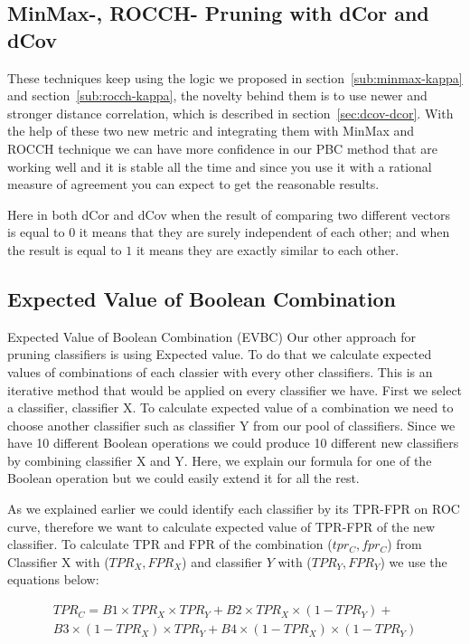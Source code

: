 \subsection{MinMax-, ROCCH- Pruning with dCor and dCov}
\label{sub:minmax-rocch-dcov}
These techniques keep using the logic we proposed in section~\ref{sub:minmax-kappa} and section~\ref{sub:rocch-kappa}, the novelty behind them is to use newer and stronger distance correlation, which is described in section~\ref{sec:dcov-dcor}. With the help of these two new metric and integrating them with MinMax and ROCCH technique we can have more confidence in our PBC method that are working well and it is stable all the time and since you use it with a rational measure of agreement you can expect to get the reasonable results.

Here in both dCor and dCov when the result of comparing two different vectors is equal to $0$ it means that they are surely independent of each other; and when the result is equal to $1$ it means they are exactly similar to each other.

\subsection{Expected Value of Boolean Combination}
\label{sub:expected-value}

Expected Value of Boolean Combination (EVBC)
Our other approach for pruning classifiers is using Expected value. To do that we calculate expected values of combinations of each classier with every other classifiers. This is an iterative method that would be applied on every classifier we have. First we select a classifier, classifier X. To calculate expected value of a combination we need to choose another classifier such as classifier Y from our pool of classifiers. Since we have 10 different Boolean operations we could produce 10 different new classifiers by combining classifier X and Y. Here, we explain our formula for one of the Boolean operation but we could easily extend it for all the rest.

As we explained earlier we could identify each classifier by its TPR-FPR on ROC curve, therefore we want to calculate expected value of TPR-FPR of the new classifier. To calculate TPR and FPR of the combination ($tpr_C, fpr_C$) from Classifier X with ($TPR_X, FPR_X$) and classifier $Y$ with ($TPR_Y, FPR_Y$) we use the equations below:

\begin{multline}
TPR_C = B1 \times TPR_X \times TPR_Y+B2\times TPR_X \times(1- TPR_Y)+\\B3\times(1- TPR_X)\times TPR_Y+B4\times(1- TPR_X)\times(1- TPR_Y)
\end{multline}

